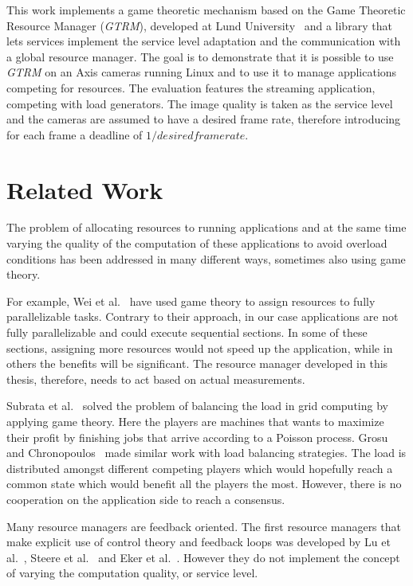 \documentclass[nobiblatex]{LTHthesis}
\begin{document}
This work implements a game theoretic mechanism based on the Game Theoretic 
Resource Manager (\emph{GTRM}), developed at Lund University~\cite{gtrm} and a
library that lets services implement the service level adaptation and the
communication with a global resource manager. The goal is to demonstrate
that it is possible to use \emph{GTRM} on an Axis cameras running Linux and to use
it to manage applications competing for resources. The evaluation features
the streaming application, competing with load generators. The image quality
is taken as the service level and the cameras are assumed to have a desired
frame rate, therefore introducing for each frame a deadline of 
\(1/desired framerate\).

\section{Related Work}

The problem of allocating resources to running applications and at the same
time varying the quality of the computation of these applications to avoid
overload conditions has been addressed in many different ways, sometimes
also using game theory.  

For example, Wei et al.~\cite{Wei10} have used game theory to assign
resources to fully parallelizable tasks. Contrary to their approach, in our
case applications are not fully parallelizable and could execute sequential
sections. In some of these sections, assigning more resources would not
speed up the application, while in others the benefits will be significant.
The resource manager developed in this thesis, therefore, needs to act based
on actual measurements.

Subrata et al.~\cite{Sub08} solved the problem of balancing the load in grid 
computing by applying game theory. Here the players are machines that wants 
to maximize their profit by finishing jobs that arrive according to a 
Poisson process. Grosu and Chronopoulos~\cite{Gro05} made similar work with 
load balancing strategies. The load is distributed amongst different 
competing players which would hopefully reach a common state which would 
benefit all the players the most. However, there is no cooperation on the
application side to reach a consensus.

Many resource managers are feedback oriented. The first resource managers
that make explicit use of control theory and feedback loops was developed 
by Lu et al.~\cite{LuS99a}, Steere et al.~\cite{Ste99} and Eker et 
al.~\cite{Eke00}. However they do not implement the concept of varying the
computation quality, or service level.
\end{document}
